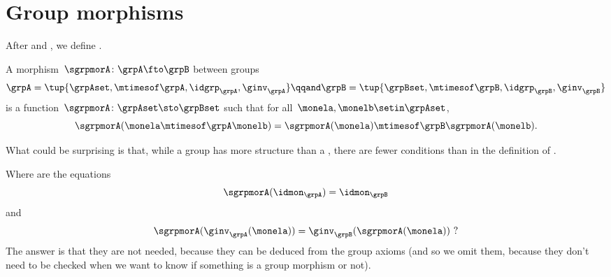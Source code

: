 \section{Group morphisms}

After  and , we define .


\begin{ctdefinition}
    \label{def:group-mor}
    A morphism~$\sgrpmorA\colon \grpA \fto \grpB$ between groups
    \begin{equation}
        \grpA = \tup{\grpAset, {{\mtimesof\grpA}}, \idgrp_\grpA, \ginv_\grpA}
        \qqand
        \grpB = \tup{\grpBset, {{\mtimesof\grpB}}, \idgrp_\grpB, \ginv_\grpB}
    \end{equation}
    is a function~$\sgrpmorA \colon \grpAset \sto \grpBset$ such that for all~$\monela, \monelb\setin \grpAset$,
    \begin{equation}
        \label{eq:group-mor-comp}
        \sgrpmorA (\monela \mtimesof\grpA \monelb) = \sgrpmorA (\monela) \mtimesof\grpB \sgrpmorA(\monelb).
    \end{equation}
\end{ctdefinition}

What could be surprising is that, while a group has more structure than a , there are fewer conditions than in the definition of .

Where are the equations
\begin{equation}
    \label{eq:grp-id-comp}
    \sgrpmorA (\idmon_\grpA) = \idmon_{\grpB}
\end{equation}
and
\begin{equation}
    \label{eq:grp-inv-comp}
    \sgrpmorA (\ginv_\grpA(\monela)) = \ginv_\grpB(\sgrpmorA(\monela)) \ ?
\end{equation}
%
The answer is that they are not needed, because they can be deduced from the group axioms (and so we omit them, because they don't need to be checked when we want to know if something is a group morphism or not).

